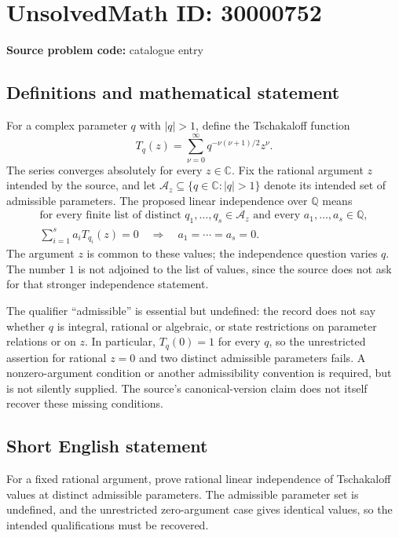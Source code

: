 \documentclass[11pt]{article}
\newcommand{\Q}{\mathbb{Q}}
\newcommand{\C}{\mathbb{C}}
\begin{document}
\section*{UnsolvedMath ID: 30000752}
\textbf{Source problem code:} catalogue entry
\subsection{Definitions and mathematical statement}
For a complex parameter $q$ with $|q|>1$, define the Tschakaloff function
\[
T_q(z)=\sum_{\nu=0}^{\infty}q^{-\nu(\nu+1)/2}z^\nu.
\]
The series converges absolutely for every $z\in\C$. Fix the rational argument $z$ intended by the source, and let $\mathcal A_z\subseteq\{q\in\C:|q|>1\}$ denote its intended set of admissible parameters. The proposed linear independence over $\Q$ means
\[
\begin{gathered}
\text{for every finite list of distinct }q_1,\ldots,q_s\in\mathcal A_z
\text{ and every }a_1,\ldots,a_s\in\Q,\\
\sum_{i=1}^{s}a_iT_{q_i}(z)=0\quad\Longrightarrow\quad a_1=\cdots=a_s=0.
\end{gathered}
\]
The argument $z$ is common to these values; the independence question varies $q$. The number $1$ is not adjoined to the list of values, since the source does not ask for that stronger independence statement.

The qualifier ``admissible'' is essential but undefined: the record does not say whether $q$ is integral, rational or algebraic, or state restrictions on parameter relations or on $z$. In particular, $T_q(0)=1$ for every $q$, so the unrestricted assertion for rational $z=0$ and two distinct admissible parameters fails. A nonzero-argument condition or another admissibility convention is required, but is not silently supplied. The source's canonical-version claim does not itself recover these missing conditions.
\subsection{Short English statement}
For a fixed rational argument, prove rational linear independence of Tschakaloff values at distinct admissible parameters. The admissible parameter set is undefined, and the unrestricted zero-argument case gives identical values, so the intended qualifications must be recovered.
\end{document}
